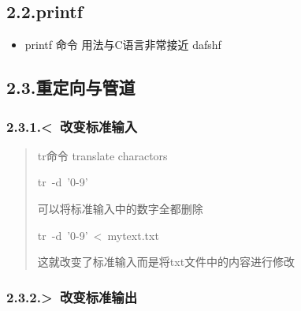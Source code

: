 \documentclass{article}
\begin{document}
\subsection{2.2.\hspace*{0.5em}printf}\label{sec-printf}%

\begin{itemize}[noitemsep,topsep=\mdcompacttopsep]%

\item{}printf 命令
用法与C语言非常接近
dafshf%
\end{itemize}%

\subsection{2.3.\hspace*{0.5em}重定向与管道}\label{section}%

\subsubsection{2.3.1.\hspace*{0.5em}\textless{}~改变标准输入}\label{sec--}%

\begin{quote}%

\noindent{}tr命令\mdbr
{}translate charactors %
\begin{mdpre}%
\noindent{}tr~-d~'0-9'%
\end{mdpre}\noindent{}可以将标准输入中的数字全都删除
\begin{mdpre}%
\noindent{}tr~-d~'0-9'~\textless{}~mytext.txt%
\end{mdpre}\noindent{}这就改变了标准输入而是将txt文件中的内容进行修改
\end{quote}%

\subsubsection{2.3.2.\hspace*{0.5em}\textgreater{}~改变标准输出}\label{sec--}%
\end{document}
